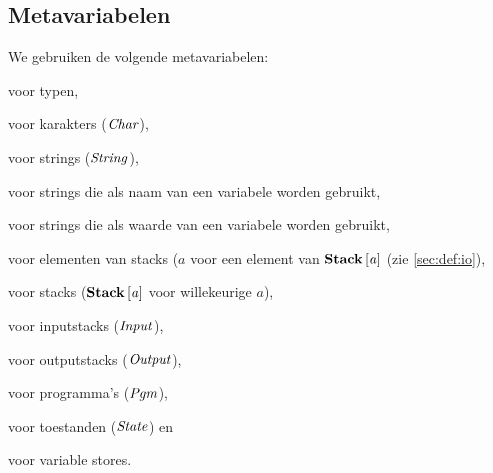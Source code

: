 \subsection{Metavariabelen}
\label{sec:def:meta}
We gebruiken de volgende metavariabelen:

\begin{description}[labelindent=\parindent]
	\item[$a$] voor typen,
	\item[$c$] voor karakters ($\mathit{Char}$),
	\item[$s$] voor strings ($\mathit{String}$),
	\item[$\var$] voor strings die als naam van een variabele worden gebruikt,
	\item[$\val$] voor strings die als waarde van een variabele worden gebruikt,
	\item[$e$] voor elementen van stacks ($a$ voor een element van $\mathbf{Stack}\left[\mathit{a}\right]$
		(zie \autoref{sec:def:io}),
	\item[$\stk$] voor stacks ($\mathbf{Stack}\left[\mathit{a}\right]$ voor willekeurige $a$),
	\item[$\ip$] voor inputstacks ($\mathit{Input}$),
	\item[$\op$] voor outputstacks ($\mathit{Output}$),
	\item[$\pgm$] voor programma's ($\mathit{Pgm}$),
	\item[$\st$] voor toestanden ($\mathit{State}$) en
	\item[$\str$] voor variable stores.
\end{description}
